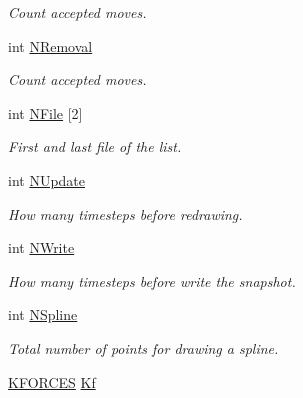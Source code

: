 \begin{DoxyCompactItemize}
\begin{DoxyCompactList}\small\item\em \-Count accepted moves. \end{DoxyCompactList}\item 
\hypertarget{classForces_aeeef7711986a24838884d8ef8c12f4ae}{int \hyperlink{classForces_aeeef7711986a24838884d8ef8c12f4ae}{\-N\-Removal}}\label{classForces_aeeef7711986a24838884d8ef8c12f4ae}

\begin{DoxyCompactList}\small\item\em \-Count accepted moves. \end{DoxyCompactList}\item 
\hypertarget{classForces_afc36f5ebb0ee5c1be5fc2161e1fa3959}{int \hyperlink{classForces_afc36f5ebb0ee5c1be5fc2161e1fa3959}{\-N\-File} \mbox{[}2\mbox{]}}\label{classForces_afc36f5ebb0ee5c1be5fc2161e1fa3959}

\begin{DoxyCompactList}\small\item\em \-First and last file of the list. \end{DoxyCompactList}\item 
\hypertarget{classForces_ab8c3546f48b68bd8fa59174d8a5afa97}{int \hyperlink{classForces_ab8c3546f48b68bd8fa59174d8a5afa97}{\-N\-Update}}\label{classForces_ab8c3546f48b68bd8fa59174d8a5afa97}

\begin{DoxyCompactList}\small\item\em \-How many timesteps before redrawing. \end{DoxyCompactList}\item 
\hypertarget{classForces_adcaf21deb47f48c1e25997f52ebd09d6}{int \hyperlink{classForces_adcaf21deb47f48c1e25997f52ebd09d6}{\-N\-Write}}\label{classForces_adcaf21deb47f48c1e25997f52ebd09d6}

\begin{DoxyCompactList}\small\item\em \-How many timesteps before write the snapshot. \end{DoxyCompactList}\item 
\hypertarget{classForces_a41019c483f6a39b86e1e25d07b99ee58}{int \hyperlink{classForces_a41019c483f6a39b86e1e25d07b99ee58}{\-N\-Spline}}\label{classForces_a41019c483f6a39b86e1e25d07b99ee58}

\begin{DoxyCompactList}\small\item\em \-Total number of points for drawing a spline. \end{DoxyCompactList}\item 
\hypertarget{classForces_a774d65ef8685d2859fae66bad8c9b435}{\hyperlink{structKFORCES}{\-K\-F\-O\-R\-C\-E\-S} \hyperlink{classForces_a774d65ef8685d2859fae66bad8c9b435}{\-Kf}}\label{classForces_a774d65ef8685d2859fae66bad8c9b435}


\end{DoxyCompactItemize}

